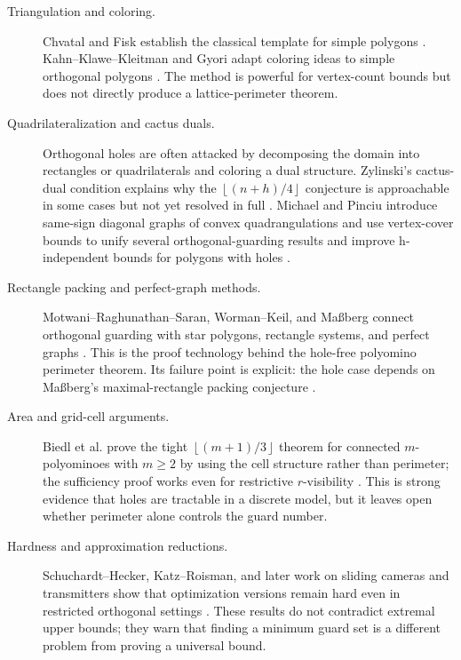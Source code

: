 \documentclass[11pt]{article}
\newcommand{\floor}[1]{\left\lfloor #1 \right\rfloor}
\begin{document}
\begin{description}
  \item[Triangulation and coloring.]
  Chvatal and Fisk establish the classical template for simple polygons
  \cite{Chvatal1975,Fisk1978}.  Kahn--Klawe--Kleitman and Gyori adapt
  coloring ideas to simple orthogonal polygons
  \cite{KahnKlaweKleitman1983,Gyori1986}.  The method is powerful for
  vertex-count bounds but does not directly produce a lattice-perimeter
  theorem.

  \item[Quadrilateralization and cactus duals.]
  Orthogonal holes are often attacked by decomposing the domain into
  rectangles or quadrilaterals and coloring a dual structure.  Zylinski's
  cactus-dual condition explains why the $\floor{(n+h)/4}$ conjecture is
  approachable in some cases but not yet resolved in full
  \cite{Zylinski2006}.  Michael and Pinciu introduce same-sign diagonal graphs
  of convex quadrangulations and use vertex-cover bounds to unify several
  orthogonal-guarding results and improve h-independent bounds for polygons
  with holes \cite{MichaelPinciu2016}.

  \item[Rectangle packing and perfect-graph methods.]
  Motwani--Raghunathan--Saran, Worman--Keil, and Ma{\ss}berg connect
  orthogonal guarding with star polygons, rectangle systems, and perfect
  graphs \cite{MotwaniRaghunathanSaran1990,WormanKeil2007,Massberg2014}.
  This is the proof technology behind the hole-free polyomino perimeter
  theorem.  Its failure point is explicit: the hole case depends on
  Ma{\ss}berg's maximal-rectangle packing conjecture
  \cite[Conj.~6.10]{MassbergHabilitation}.

  \item[Area and grid-cell arguments.]
  Biedl et al. prove the tight $\floor{(m+1)/3}$ theorem for connected
  $m$-polyominoes with $m\geq 2$ by using the cell structure rather than
  perimeter; the sufficiency proof works even for restrictive $r$-visibility
  \cite[Theorem~1 and Cor.~1]{BiedlEtAl2012}.  This is strong evidence that
  holes are tractable in a discrete model, but it leaves open whether
  perimeter alone controls the guard number.

  \item[Hardness and approximation reductions.]
  Schuchardt--Hecker, Katz--Roisman, and later work on sliding cameras and
  transmitters show that optimization versions remain hard even in restricted
  orthogonal settings
  \cite{SchuchardtHecker1995,KatzRoisman2008,DurocherEtAl2017,BiedlEtAl2019}.
  These results do not contradict extremal upper bounds; they warn that
  finding a minimum guard set is a different problem from proving a universal
  bound.


\end{description}
\end{document}
